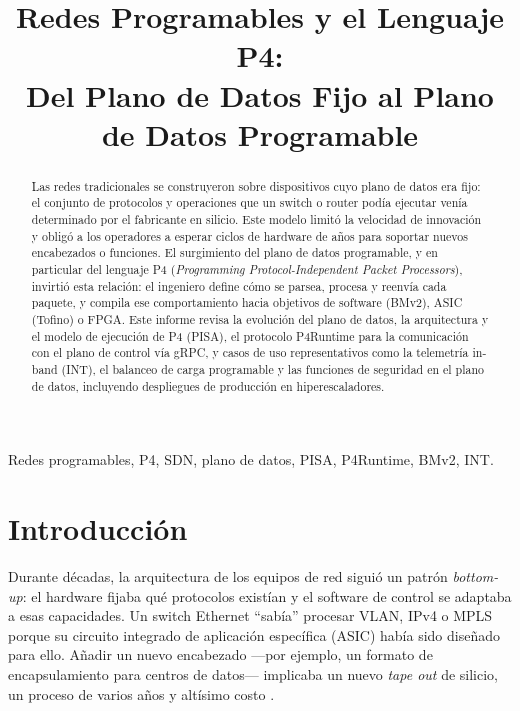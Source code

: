 \documentclass[conference,onecolumn,10pt]{IEEEtran}
\begin{document}
\title{Redes Programables y el Lenguaje P4:\\
Del Plano de Datos Fijo al Plano de Datos Programable}

\author{
}

\maketitle

\begin{abstract}
Las redes tradicionales se construyeron sobre dispositivos cuyo plano de datos
era fijo: el conjunto de protocolos y operaciones que un switch o router podía
ejecutar venía determinado por el fabricante en silicio. Este modelo limitó la
velocidad de innovación y obligó a los operadores a esperar ciclos de hardware
de años para soportar nuevos encabezados o funciones. El surgimiento del plano
de datos programable, y en particular del lenguaje P4 (\emph{Programming
Protocol-Independent Packet Processors}), invirtió esta relación: el ingeniero
define cómo se parsea, procesa y reenvía cada paquete, y compila ese
comportamiento hacia objetivos de software (BMv2), ASIC (Tofino) o FPGA. Este
informe revisa la evolución del plano de datos, la arquitectura y el modelo de
ejecución de P4 (PISA), el protocolo P4Runtime para la comunicación con el plano
de control vía gRPC, y casos de uso representativos como la telemetría in-band
(INT), el balanceo de carga programable y las funciones de seguridad en el plano
de datos, incluyendo despliegues de producción en hiperescaladores.
\end{abstract}

\begin{IEEEkeywords}
Redes programables, P4, SDN, plano de datos, PISA, P4Runtime, BMv2, INT.
\end{IEEEkeywords}

\section{Introducción}
Durante décadas, la arquitectura de los equipos de red siguió un patrón
\emph{bottom-up}: el hardware fijaba qué protocolos existían y el software de
control se adaptaba a esas capacidades. Un switch Ethernet ``sabía'' procesar
VLAN, IPv4 o MPLS porque su circuito integrado de aplicación específica (ASIC)
había sido diseñado para ello. Añadir un nuevo encabezado —por ejemplo, un
formato de encapsulamiento para centros de datos— implicaba un nuevo \emph{tape
out} de silicio, un proceso de varios años y altísimo costo
\cite{bosshart2013rmt}.
\end{document}
